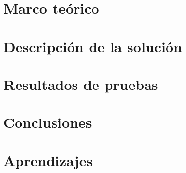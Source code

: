 \documentclass[10pt, article, natbib]{IEEEtran}
\begin{document}
\section{Marco teórico}

\section{Descripción de la solución}

\section{Resultados de pruebas}

\section{Conclusiones}

\section{Aprendizajes}
\cite{threadsInCEducative}

\newpage
\onecolumn
 

\end{document}
